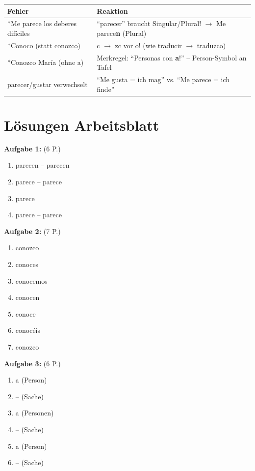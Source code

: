 \documentclass[11pt,a4paper]{article}
\begin{document}
\begin{tabular}{|p{5cm}|p{8cm}|}
\hline
\textbf{Fehler} & \textbf{Reaktion} \\
\hline
*Me parece los deberes difíciles & ``parecer'' braucht Singular/Plural! $\rightarrow$ Me parece\textbf{n} (Plural) \\
\hline
*Conoco (statt conozco) & c $\rightarrow$ zc vor o! (wie traducir $\rightarrow$ traduzco) \\
\hline
*Conozco María (ohne a) & Merkregel: ``Personas con \textbf{a}!'' -- Person-Symbol an Tafel \\
\hline
parecer/gustar verwechselt & ``Me gusta = ich mag'' vs. ``Me parece = ich finde'' \\
\hline
\end{tabular}

\section*{Lösungen Arbeitsblatt}

\textbf{Aufgabe 1:} (6 P.)
\begin{enumerate}[label=\alph)}]
    \item parecen -- parecen
    \item parece -- parece
    \item parece
    \item parece -- parece
\end{enumerate}

\textbf{Aufgabe 2:} (7 P.)
\begin{enumerate}[label=\alph)]
    \item conozco
    \item conoces
    \item conocemos
    \item conocen
    \item conoce
    \item conocéis
    \item conozco
\end{enumerate}

\textbf{Aufgabe 3:} (6 P.)
\begin{enumerate}[label=\alph)]
    \item a (Person)
    \item -- (Sache)
    \item a (Personen)
    \item -- (Sache)
    \item a (Person)
    \item -- (Sache)
\end{enumerate}
\end{document}
